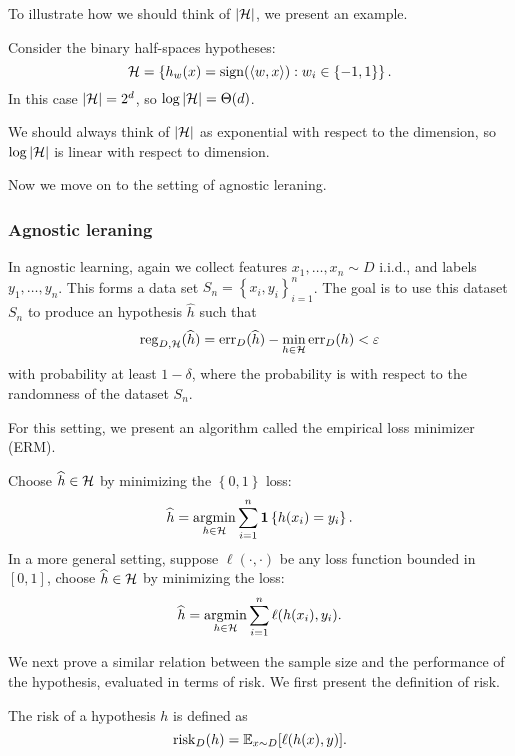 \documentclass[a4paper]{article}
\begin{document}
To illustrate how we should think of $\left\lvert \mathcal{H}\right\rvert$, 
we present an example.
\begin{eg}
Consider the binary half-spaces hypotheses: 
\[
\mathcal{H} = \left\{ h_w(x) = \operatorname{sign}(\left\langle w, x \right\rangle) : 
w_i \in \left\{ -1, 1 \right\} \right\}.
\]
In this case $\left\lvert \mathcal{H}\right\rvert = 2^d$, so $\log \left\lvert \mathcal{H}\right\rvert = 
\Theta(d)$. 

We should always think of $\left\lvert \mathcal{H}\right\rvert$
as exponential with respect to the dimension, so 
$\log \left\lvert \mathcal{H}\right\rvert$ is linear with respect to dimension.
\end{eg}

Now we move on to the setting of agnostic leraning.

\subsubsection{Agnostic leraning}

In agnostic learning, again we collect features $x_1, \dots,
x_n \sim D$ i.i.d., and labels $y_1, \dots, y_n$. This forms a 
data set $S_n = \left\{ x_i, y_i \right\}_{i=1}^n$. The 
goal is to use this dataset $S_n$ to produce an hypothesis 
$\hat{h}$ such that 
\[
\operatorname{reg}_{D, \mathcal{H}} (\widehat{h}) = 
\operatorname{err}_D (\widehat{h}) - \min_{h \in \mathcal{H}} \operatorname{err}_D (h) < \varepsilon
\]
with probability at least $1 - \delta$, where the probability
is with respect to the randomness of the dataset $S_n$.

For this setting, we present an algorithm called the empirical 
loss minimizer (ERM). 
\begin{algorithm}
  Choose $\widehat{h} \in \mathcal{H}$ by minimizing the $\left\{ 0,1
   \right\}$ loss:
  \[
  \widehat{h} = \operatorname*{argmin}_{h \in \mathcal{H}} \sum_{i=1}^n \mathbf{1} \left\{ 
    h(x_i) = y_i
   \right\}.
  \]
  In a more general setting, suppose $\ell(\cdot, \cdot)$ 
  be any loss function bounded in $[0, 1]$, choose 
  $\widehat{h} \in \mathcal{H}$ by minimizing the loss:
  \[
  \widehat{h} = \operatorname*{argmin}_{h \in \mathcal{H}} \sum_{i=1}^n \ell(h(x_i), 
  y_i).
  \] 
\end{algorithm}

We next prove a similar relation between the sample 
size and the performance of the hypothesis, evaluated 
in terms of risk. We first present the definition 
of risk.

\begin{defi}[Risk]
  The risk of a hypothesis $h$ is defined as 
  \[
  \operatorname{risk}_D (h) = \mathbb{E}_{x \sim D} [ \ell(h(x), y) ].
  \]
\end{defi}
\end{document}
